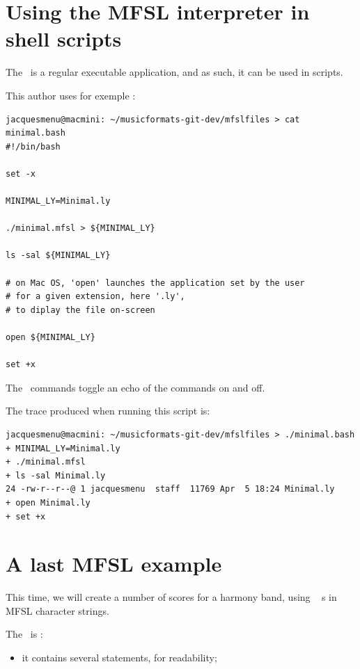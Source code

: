 \section{Using the MFSL interpreter in shell scripts}\label{Using the MFSL interpreter in shell scripts}

The \mfslInterp\ is a regular executable application, and as such, it can be used in scripts.

This author uses for exemple :
\begin{lstlisting}[language=Terminal]
jacquesmenu@macmini: ~/musicformats-git-dev/mfslfiles > cat minimal.bash
#!/bin/bash

set -x

MINIMAL_LY=Minimal.ly

./minimal.mfsl > ${MINIMAL_LY}

ls -sal ${MINIMAL_LY}

# on Mac OS, 'open' launches the application set by the user
# for a given extension, here '.ly',
# to diplay the file on-screen

open ${MINIMAL_LY}

set +x
\end{lstlisting}

The  \bash\ commands toggle an echo of the commands on and off.

The trace produced when running this script is:
\begin{lstlisting}[language=Terminal]
jacquesmenu@macmini: ~/musicformats-git-dev/mfslfiles > ./minimal.bash
+ MINIMAL_LY=Minimal.ly
+ ./minimal.mfsl
+ ls -sal Minimal.ly
24 -rw-r--r--@ 1 jacquesmenu  staff  11769 Apr  5 18:24 Minimal.ly
+ open Minimal.ly
+ set +x
\end{lstlisting}


\section{A last MFSL example}

This time, we will create a number of scores for a harmony band, using \lily\  s in MFSL character strings.

The \script\ is :
\begin{itemize}
\item it contains several  statements, for readability;
\end{itemize}


